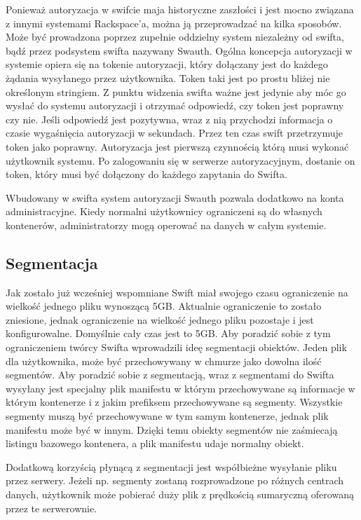 Ponieważ autoryzacja w swifcie maja historyczne zaszłości i jest mocno związana z innymi systemami Rackspace'a, można ją przeprowadzać na kilka sposobów. Może być prowadzona poprzez zupełnie oddzielny system niezależny od swifta, bądź przez podsystem swifta nazywany Swauth. Ogólna koncepcja autoryzacji w systemie opiera się na tokenie autoryzacji, który dołączany jest do każdego żądania wysyłanego przez użytkownika. Token taki jest po prostu bliżej nie określonym stringiem. Z punktu widzenia swifta ważne jest jedynie aby móc go wysłać do systemu autoryzacji i otrzymać odpowiedź, czy token jest poprawny czy nie. Jeśli odpowiedź jest pozytywna, wraz z nią przychodzi informacja o czasie wygaśnięcia autoryzacji w sekundach. Przez ten czas swift przetrzymuje token jako poprawny. Autoryzacja jest pierwszą czynnością którą musi wykonać użytkownik systemu. Po zalogowaniu się w serwerze autoryzacyjnym, dostanie on token, który musi być dołączony do każdego zapytania do Swifta.

Wbudowany w swifta system autoryzacji Swauth pozwala dodatkowo na konta administracyjne. Kiedy normalni użytkownicy ograniczeni są do własnych kontenerów, administratorzy mogą operować na danych w całym systemie.

\subsection{Segmentacja}\label{sec:segmentacja}

Jak zostało już wcześniej wspomniane Swift miał swojego czasu ograniczenie na wielkość jednego pliku wynoszącą 5GB. Aktualnie ograniczenie to zostało zniesione, jednak ograniczenie na wielkość jednego pliku pozostaje i jest konfigurowalne. Domyślnie cały czas jest to 5GB. Aby poradzić sobie z tym ograniczeniem twórcy Swifta wprowadzili ideę segmentacji obiektów. Jeden plik dla użytkownika, może być przechowywany w chmurze jako dowolna ilość segmentów. Aby poradzić sobie z segmentacją, wraz z segmentami do Swifta wysyłany jest specjalny plik manifestu w którym przechowywane są informacje w którym kontenerze i z jakim prefiksem przechowywane są segmenty. Wszystkie segmenty muszą być przechowywane w tym samym kontenerze, jednak plik manifestu może być w innym. Dzięki temu obiekty segmentów nie zaśmiecają listingu bazowego kontenera, a plik manifestu udaje normalny obiekt.

Dodatkową korzyścią płynącą z segmentacji jest współbieżne wysyłanie pliku przez serwery. Jeżeli np. segmenty zostaną rozprowadzone po różnych centrach danych, użytkownik może pobierać duży plik z prędkością sumaryczną oferowaną przez te serwerownie.

